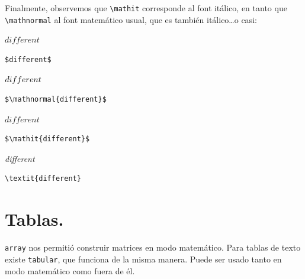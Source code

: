 {Finalmente, observemos que \verb+\mathit+ corresponde al font
it{\'a}lico, en tanto que \verb+\mathnormal+ al font matem{\'a}tico
usual, que es tambi{\'e}n it{\'a}lico\ldots o casi:

\vspace{.3cm}
{\small
\begin{minipage}[t]{3cm}
$different$
\end{minipage}
\hspace{2cm}
\begin{minipage}[t]{3cm}
\begin{verbatim}
$different$
\end{verbatim}
\end{minipage}

\begin{minipage}[t]{3cm}
$\mathnormal{different}$
\end{minipage}
\hspace{2cm}
\begin{minipage}[t]{3cm}
\begin{verbatim}
$\mathnormal{different}$
\end{verbatim}
\end{minipage}

\begin{minipage}[t]{3cm}
$\mathit{different}$
\end{minipage}
\hspace{2cm}
\begin{minipage}[t]{3cm}
\begin{verbatim}
$\mathit{different}$
\end{verbatim}
\end{minipage}

\begin{minipage}[t]{3cm}
\textit{different}
\end{minipage}
\hspace{2cm}
\begin{minipage}[t]{3cm}
\begin{verbatim}
\textit{different}
\end{verbatim}
\end{minipage}

}
\vspace{.3cm}



\section{Tablas.}

\verb+array+ nos permiti{\'o} construir matrices en modo matem{\'a}tico.
Para tablas de texto existe \verb+tabular+, que funciona de la misma
manera. Puede ser usado tanto en modo matem{\'a}tico como fuera de
{\'e}l. 

}
